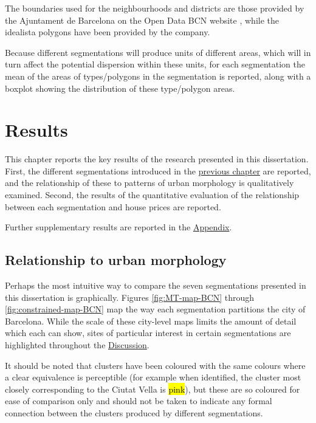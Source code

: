 \documentclass[a4paper, nobind]{templates/ociamthesis}
\begin{document}
The boundaries used for the neighbourhoods and districts are those provided by the Ajuntament de Barcelona on the Open Data BCN website \citep{institutmunicipaldinformàtica2017}, while the idealista polygons have been provided by the company.

Because different segmentations will produce units of different areas, which will in turn affect the potential dispersion within these units, for each segmentation the mean of the areas of types/polygons in the segmentation is reported, along with a boxplot showing the distribution of these type/polygon areas.

\hypertarget{results}{%
\chapter{Results}\label{results}}

\minitoc 

This chapter reports the key results of the research presented in this dissertation. First, the different segmentations introduced in the \protect\hyperlink{comparing-different-segmentations}{previous chapter} are reported, and the relationship of these to patterns of urban morphology is qualitatively examined. Second, the results of the quantitative evaluation of the relationship between each segmentation and house prices are reported.

Further supplementary results are reported in the \protect\hyperlink{additional-figures}{Appendix}.

\hypertarget{relationship-to-urban-morphology}{%
\section{Relationship to urban morphology}\label{relationship-to-urban-morphology}}

Perhaps the most intuitive way to compare the seven segmentations presented in this dissertation is graphically. Figures \ref{fig:MT-map-BCN} through \ref{fig:constrained-map-BCN} map the way each segmentation partitions the city of Barcelona. While the scale of these city-level maps limits the amount of detail which each can show, sites of particular interest in certain segmentations are highlighted throughout the \protect\hyperlink{discussion}{Discussion}.

It should be noted that clusters have been coloured with the same colours where a clear equivalence is perceptible (for example when identified, the cluster most closely corresponding to the Ciutat Vella is \hl{pink}), but these are so coloured for ease of comparison only and should not be taken to indicate any formal connection between the clusters produced by different segmentations.
\end{document}
